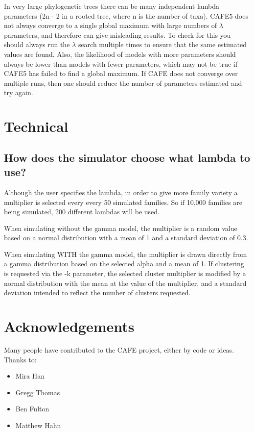 \documentclass{article}
\newcommand{\shortname}{CAFE5 }
\begin{document}
In very large phylogenetic trees there can be many independent lambda parameters (2n - 2 in a rooted tree, where n is the number of taxa). \shortname does not always converge to a single global maximum with large numbers of $\lambda$ parameters, and therefore can give misleading results. To check for this you should always run the $\lambda$ search multiple times to ensure that the same estimated values are found. Also, the likelihood of models with more parameters should always be lower than models with fewer parameters, which may not be true if \shortname has failed to find a global maximum. If CAFE does not converge over multiple runs, then one should reduce the number of parameters estimated and try again.

\section{Technical}
\subsection{How does the simulator choose what lambda to use?}

Although the user specifies the lambda, in order to give more
family variety a multiplier is selected every every 50 simulated families. So if 10,000 families are being simulated, 200 different lambdas will be used.

When simulating without the gamma model, the multiplier is a
random value based on a normal distribution
with a mean of 1 and a standard deviation of 0.3.

When simulating WITH the gamma model, the multiplier is drawn 
directly from a gamma distribution based on the selected alpha
and a mean of 1. If clustering is requested via the -k parameter,
the selected cluster multiplier is modified by a normal distribution
with the mean at the value of the multiplier, and a standard
deviation intended to reflect the number of clusters requested.

\section{Acknowledgements}
Many people have contributed to the CAFE project, either by code or ideas. Thanks to:
\begin{itemize}
  \item Mira Han
  \item Gregg Thomas
  \item Ben Fulton
  \item Matthew Hahn
\end{itemize}


\end{document}
